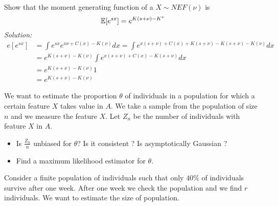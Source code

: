 \begin{ex}
	Show that the moment generating function of a \rv $X\sim NEF(\nu)$ is
	$$\mathbb{E}[e^{sx}]=e^{K(s+\nu)-K^\nu}$$
\textit{Solution:}
\[
\begin{split}
e[e^{sx}]
&=\int e^{sx}e^{x\nu+C(x)-K(\nu)}dx=\int e^{x(s+\nu)+C(x)+K(s+\nu)-K(s+\nu)-K(\nu)}dx\\
&=e^{K(s+\nu)-K(\nu)}\int e^{x(s+\nu)+C(x)-K(s+\nu)}dx\\
&=e^{K(s+\nu)-K(\nu)} 1\\
&=e^{K(s+\nu)-K(\nu)}
	\end{split}
	\]
\end{ex}



\begin{ex}
	We want to estimate the proportion $\theta$ of individuals in a population for which a certain feature $X$ takes value in $A$. We take a sample from the population of size $n$ and we measure the feature $X$. Let $Z_n$ be the number of individuals with feature $X$ in $A$. 
	\begin{itemize}
		\item
		Is $\frac{Z_n}{n}$ unbiased for $\theta$? Is it consistent ? Is asymptotically Gaussian ?
		\item
		Find a maximum likelihood estimator for $\theta$. 
	\end{itemize}
\end{ex}



\begin{ex}
	Consider a finite population of individuals such that only $40\%$ of individuals survive after one week. After one week we check the population and we find $r$ individuals. We want to estimate the size of population.
\end{ex}  

